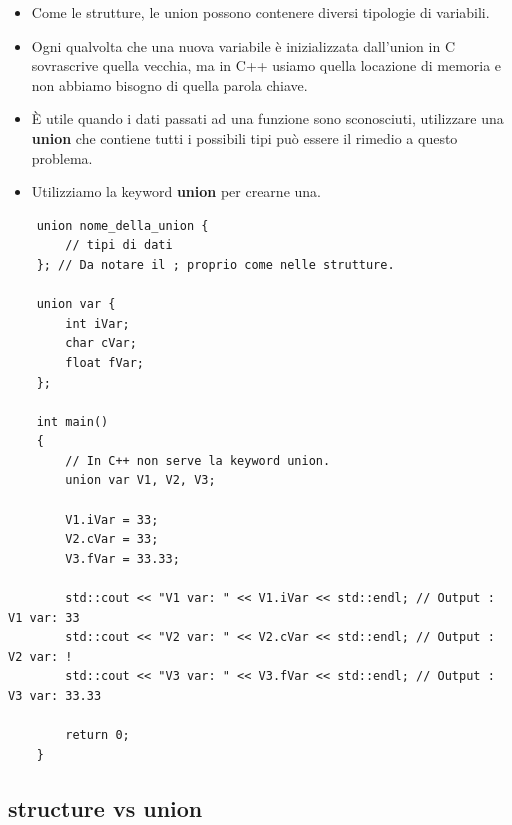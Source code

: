 \begin{itemize}
	\item \textsf{\small Come le strutture, le union possono contenere diversi tipologie di variabili.}
	\item \textsf{\small Ogni qualvolta che una nuova variabile è inizializzata dall'union in C sovrascrive quella vecchia, ma in C++ usiamo quella locazione di memoria e non abbiamo bisogno di quella parola chiave.}
	\item \textsf{\small È utile quando i dati passati ad una funzione sono sconosciuti, utilizzare una \textbf{union} che contiene tutti i possibili tipi può essere il rimedio a questo problema.}
	\item \textsf{\small Utilizziamo la keyword \textbf{union} per crearne una.}
\end{itemize}

\begin{lstlisting}
	union nome_della_union {
		// tipi di dati
	}; // Da notare il ; proprio come nelle strutture.

	union var {
		int iVar;
		char cVar;
		float fVar;
	};

	int main()
	{
		// In C++ non serve la keyword union.
		union var V1, V2, V3;
		
		V1.iVar = 33;
		V2.cVar = 33;
		V3.fVar = 33.33;
		
		std::cout << "V1 var: " << V1.iVar << std::endl; // Output : V1 var: 33
		std::cout << "V2 var: " << V2.cVar << std::endl; // Output : V2 var: !
		std::cout << "V3 var: " << V3.fVar << std::endl; // Output : V3 var: 33.33
		
		return 0;
	}
\end{lstlisting}

\subsection{structure vs union}

